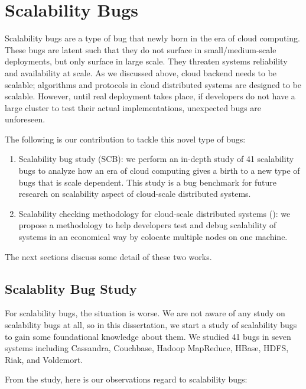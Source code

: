 \section{Scalability Bugs}

Scalability bugs are a type of bug that newly born in the era of cloud
computing. These bugs are latent such that they do not surface in
small/medium-scale deployments, but only surface in large scale. They threaten
systems reliability and availability at scale. As we discussed above, cloud
backend needs to be scalable; algorithms and protocols in cloud distributed
systems are designed to be scalable. However, until real deployment takes place,
if developers do not have a large cluster to test their actual implementations,
unexpected bugs are unforeseen. 

The following is our contribution to tackle this novel type of bugs:

\begin{enumerate}

\item Scalability bug study (SCB): we perform an in-depth study of 41
scalability bugs to analyze how an era of cloud computing gives a birth to a new
type of bugs that is scale dependent. This study is a bug benchmark for future
research on scalability aspect of cloud-scale distributed systems.

\item Scalability checking methodology for cloud-scale distributed systems
(\sck): we propose a methodology to help developers test and debug scalability
of systems in an economical way by colocate multiple nodes on one machine.

\end{enumerate}

The next sections discuss some detail of these two works.

\subsection{Scalablity Bug Study}

For scalability bugs, the situation is worse. We are not aware of any study on
scalability bugs at all, so in this dissertation, we start a study of
scalability bugs to gain some foundational knowledge about them. We studied 41
bugs in seven systems including Cassandra, Couchbase, Hadoop MapReduce, HBase,
HDFS, Riak, and Voldemort.

From the study, here is our observations regard to scalability bugs:

